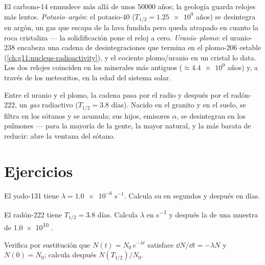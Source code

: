 \begin{example}\label{ex:g12:radioactive-decay:rocks}
El carbono-14 enmudece más allá de unos \num{50000} años; la geología guarda relojes
más lentos. \emph{Potasio--argón}: el potasio-40 ($T_{1/2} = \num{1.25e9}$ años) se
desintegra en argón, un gas que escapa de la lava fundida pero queda atrapado en
cuanto la roca cristaliza --- la solidificación pone el reloj a cero.
\emph{Uranio--plomo}: el uranio-238 encabeza una cadena de desintegraciones que
termina en el plomo-206 estable (\cref{ch:g11:nucleus-radioactivity}), y el cociente
plomo/uranio en un cristal lo data. Los dos relojes coinciden en los minerales más
antiguos ($\approx \num{4.4e9}$ años) y, a través de los meteoritos, en la edad del
sistema solar.
\end{example}

\begin{remark}\label{rem:g12:radioactive-decay:radon}
Entre el uranio y el plomo, la cadena pasa por el radio y después por el radón-222, un
\emph{gas} radiactivo ($T_{1/2} = 3.8$ días). Nacido en el granito y en el suelo, se
filtra en los sótanos y se acumula; sus hijos, emisores $\alpha$, se desintegran en
los pulmones --- para la mayoría de la gente, la mayor  natural, y la más barata
de reducir: abre la ventana del sótano.
\end{remark}

\section{Ejercicios}

\begin{exercise}[$\star$]\label{exo:g12:radioactive-decay:1}
El yodo-131 tiene $\lambda = \qty{1.0e-6}{s^{-1}}$. Calcula su  en segundos y después en días.
\end{exercise}

\begin{exercise}[$\star$]\label{exo:g12:radioactive-decay:2}
El radón-222 tiene $T_{1/2} = 3.8$ días. Calcula $\lambda$ en \unit{s^{-1}} y después
la  de una muestra de \num{1.0e10} .
\end{exercise}

\begin{exercise}[$\star$]\label{exo:g12:radioactive-decay:3}
Verifica por sustitución que $N(t) = N_0\,e^{-\lambda t}$ satisface
$\dd N/\dd t = -\lambda N$ y $N(0) = N_0$; calcula después $N(T_{1/2})/N_0$.
\end{exercise}

